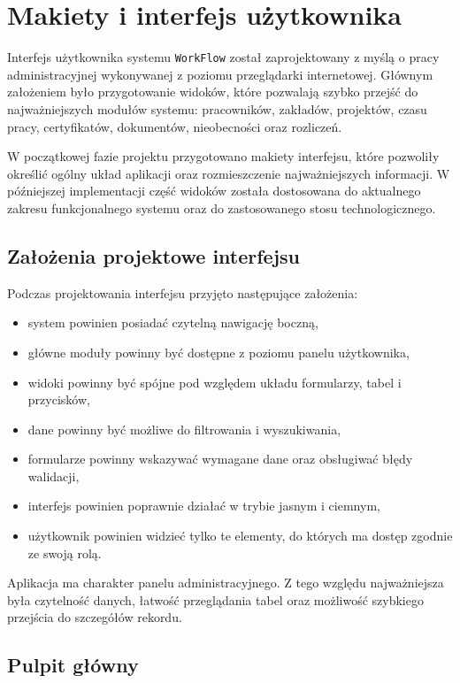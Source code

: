 \section{Makiety i interfejs użytkownika}

Interfejs użytkownika systemu \texttt{WorkFlow} został zaprojektowany z myślą o pracy administracyjnej wykonywanej z poziomu przeglądarki internetowej. Głównym założeniem było przygotowanie widoków, które pozwalają szybko przejść do najważniejszych modułów systemu: pracowników, zakładów, projektów, czasu pracy, certyfikatów, dokumentów, nieobecności oraz rozliczeń.

W początkowej fazie projektu przygotowano makiety interfejsu, które pozwoliły określić ogólny układ aplikacji oraz rozmieszczenie najważniejszych informacji. W późniejszej implementacji część widoków została dostosowana do aktualnego zakresu funkcjonalnego systemu oraz do zastosowanego stosu technologicznego.

\subsection{Założenia projektowe interfejsu}

Podczas projektowania interfejsu przyjęto następujące założenia:
\begin{itemize}
    \item system powinien posiadać czytelną nawigację boczną,
    \item główne moduły powinny być dostępne z poziomu panelu użytkownika,
    \item widoki powinny być spójne pod względem układu formularzy, tabel i przycisków,
    \item dane powinny być możliwe do filtrowania i wyszukiwania,
    \item formularze powinny wskazywać wymagane dane oraz obsługiwać błędy walidacji,
    \item interfejs powinien poprawnie działać w trybie jasnym i ciemnym,
    \item użytkownik powinien widzieć tylko te elementy, do których ma dostęp zgodnie ze swoją rolą.
\end{itemize}

Aplikacja ma charakter panelu administracyjnego. Z tego względu najważniejsza była czytelność danych, łatwość przeglądania tabel oraz możliwość szybkiego przejścia do szczegółów rekordu.

\subsection{Pulpit główny}

